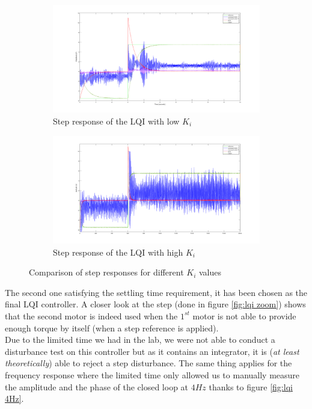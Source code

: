 \begin{figure}[H]
    \centering
    \begin{subfigure}[b]{0.5\textwidth}
        \centering
        \includegraphics[width=\textwidth]{Pictures/McGiver1.png}
        \caption{Step response of the LQI with low $K_i$}
    \end{subfigure}%
    \begin{subfigure}[b]{0.5\textwidth}
        \centering
        \includegraphics[width=\textwidth]{Pictures/McGiver2.png}
        \caption{Step response of the LQI with high $K_i$}
    \end{subfigure}
    \caption{Comparison of step responses for different $K_i$ values}
\end{figure}

The second one satisfying the settling time requirement, it has been chosen as the final LQI controller. A closer look
at the step (done in figure \ref{fig:lqi zoom}) shows that the second motor is indeed used when the $1^{st}$ motor is
not able to provide enough torque by itself (when a step reference is applied).\\
Due to the limited time we had in the lab, we were not able to conduct a disturbance test on this controller but as it
contains an integrator, it is (\textit{at least theoretically}) able to reject a step disturbance. The same thing applies
for the frequency response where the limited time only allowed us to manually measure the amplitude and the phase of the
closed loop at $4 Hz$ thanks to figure \ref{fig:lqi 4Hz}.

